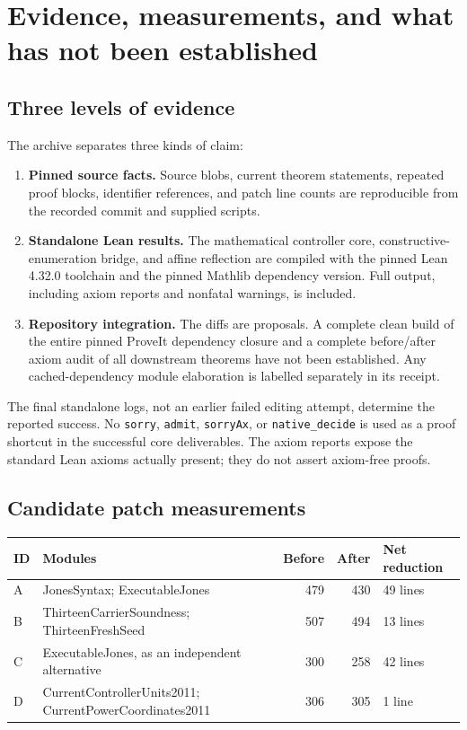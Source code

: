 \documentclass[11pt,letterpaper]{article}
\newcommand{\code}[1]{{\small\nolinkurl{#1}}}
\begin{document}
\section{Evidence, measurements, and what has not been established}
\label{sec:validation}

\subsection{Three levels of evidence}

The archive separates three kinds of claim:

\begin{enumerate}
\item \textbf{Pinned source facts.} Source blobs, current theorem statements, repeated proof blocks, identifier references, and patch line counts are reproducible from the recorded commit and supplied scripts.
\item \textbf{Standalone Lean results.} The mathematical controller core, constructive-enumeration bridge, and affine reflection are compiled with the pinned Lean 4.32.0 toolchain and the pinned Mathlib dependency version. Full output, including axiom reports and nonfatal warnings, is included.
\item \textbf{Repository integration.} The diffs are proposals. A complete clean build of the entire pinned ProveIt dependency closure and a complete before/after axiom audit of all downstream theorems have not been established. Any cached-dependency module elaboration is labelled separately in its receipt.
\end{enumerate}

The final standalone logs, not an earlier failed editing attempt, determine the reported success. No \code{sorry}, \code{admit}, \code{sorryAx}, or \code{native_decide} is used as a proof shortcut in the successful core deliverables. The axiom reports expose the standard Lean axioms actually present; they do not assert axiom-free proofs.

\subsection{Candidate patch measurements}

\begin{tabularx}{\textwidth}{@{}p{}Xrrp{}@{}}
\toprule
ID & Modules & Before & After & Net reduction \\
\midrule
A & JonesSyntax; ExecutableJones & 479 & 430 & 49 lines \\
B & ThirteenCarrierSoundness; ThirteenFreshSeed & 507 & 494 & 13 lines \\
C & ExecutableJones, as an independent alternative & 300 & 258 & 42 lines \\
D & CurrentControllerUnits2011; CurrentPowerCoordinates2011 & 306 & 305 & 1 line \\
\bottomrule
\end{tabularx}
\end{document}
